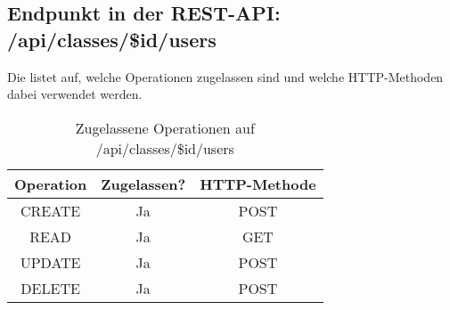 \subsection{Endpunkt in der REST-API: /api/classes/\$id/users}
Die  listet auf, welche Operationen zugelassen sind und welche HTTP-Methoden dabei verwendet werden. 

\begin{table}[!htbp]
	\begin{tabular}{|c|c|c|}
		\hline
			\textbf{Operation} & \textbf{Zugelassen?} & \textbf{HTTP-Methode} \\ \hline
			CREATE & Ja & POST \\ \hline 
			READ & Ja & GET \\ \hline
			UPDATE & Ja & POST \\ \hline 
			DELETE & Ja & POST \\ \hline
	\end{tabular}

		\caption{Zugelassene Operationen auf /api/classes/\$id/users}
		\label{tab:rest:api:classes:id:users:meth}
\end{table}